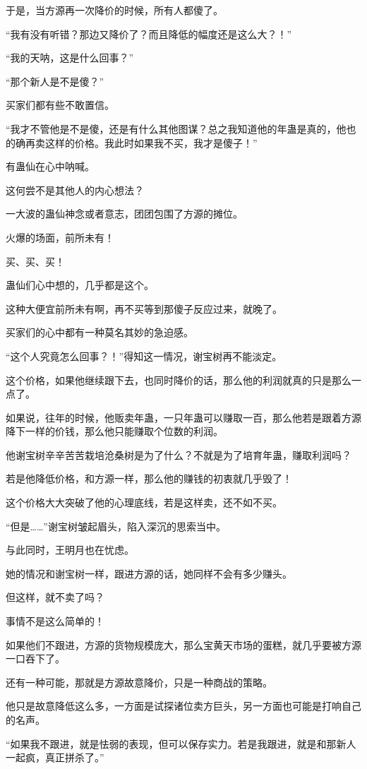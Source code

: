 \begin{this_body}
于是，当方源再一次降价的时候，所有人都傻了。

“我有没有听错？那边又降价了？而且降低的幅度还是这么大？！”

“我的天呐，这是什么回事？”

“那个新人是不是傻？”

买家们都有些不敢置信。

“我才不管他是不是傻，还是有什么其他图谋？总之我知道他的年蛊是真的，他也的确再卖这样的价格。我此时如果我不买，我才是傻子！”

有蛊仙在心中呐喊。

这何尝不是其他人的内心想法？

一大波的蛊仙神念或者意志，团团包围了方源的摊位。

火爆的场面，前所未有！

买、买、买！

蛊仙们心中想的，几乎都是这个。

这种大便宜前所未有啊，再不买等到那傻子反应过来，就晚了。

买家们的心中都有一种莫名其妙的急迫感。

“这个人究竟怎么回事？！”得知这一情况，谢宝树再不能淡定。

这个价格，如果他继续跟下去，也同时降价的话，那么他的利润就真的只是那么一点了。

如果说，往年的时候，他贩卖年蛊，一只年蛊可以赚取一百，那么他若是跟着方源降下一样的价钱，那么他只能赚取个位数的利润。

他谢宝树辛辛苦苦栽培沧桑树是为了什么？不就是为了培育年蛊，赚取利润吗？

若是他降低价格，和方源一样，那么他的赚钱的初衷就几乎毁了！

这个价格大大突破了他的心理底线，若是这样卖，还不如不买。

“但是……”谢宝树皱起眉头，陷入深沉的思索当中。

与此同时，王明月也在忧虑。

她的情况和谢宝树一样，跟进方源的话，她同样不会有多少赚头。

但这样，就不卖了吗？

事情不是这么简单的！

如果他们不跟进，方源的货物规模庞大，那么宝黄天市场的蛋糕，就几乎要被方源一口吞下了。

还有一种可能，那就是方源故意降价，只是一种商战的策略。

他只是故意降低这么多，一方面是试探诸位卖方巨头，另一方面也可能是打响自己的名声。

“如果我不跟进，就是怯弱的表现，但可以保存实力。若是我跟进，就是和那新人一起疯，真正拼杀了。”


\end{this_body}
